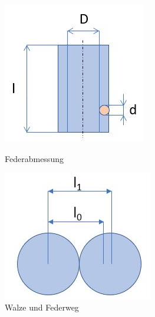 \begin{figure}[H]
   \begin{minipage}[hbt]{.4\linewidth} %
      \includegraphics[width=\linewidth]{Bilder/Powerpoint/Feder}
      \caption{Federabmessung}
      \label{SkizzeFeder} 
   \end{minipage}
   \hspace{.1\linewidth}%
   \begin{minipage}[hbt]{.4\linewidth} %
      \includegraphics[width=\linewidth]{Bilder/Powerpoint/Federkonstante}
      \caption{Walze und Federweg}
      \label{SkizzeFederkonstante}
   \end{minipage}
\end{figure}


